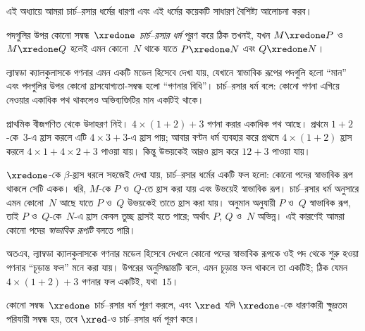 \documentclass[../../../include/open-logic-section]{subfiles}
\begin{document}


এই অধ্যায়ে আমরা চার্চ--রসার ধর্মের ধারণা এবং এই ধর্মের কয়েকটি সাধারণ
বৈশিষ্ট্য আলোচনা করব।

\begin{defn}[চার্চ--রসার ধর্ম, CR] পদগুলির উপর কোনো সম্বন্ধ~$\xredone$
  \emph{চার্চ--রসার ধর্ম} পূরণ করে ঠিক তখনই, যখন $M \xredone P$ ও
  $M \xredone Q$ হলেই এমন কোনো~$N$ থাকে যাতে $P \xredone N$ এবং
  $Q \xredone N$।
\end{defn}

ল্যাম্বডা ক্যালকুলাসকে গণনার এমন একটি মডেল হিসেবে দেখা যায়, যেখানে
স্বাভাবিক রূপের পদগুলি হলো “মান” এবং পদগুলির উপর কোনো হ্রাসযোগ্যতা-সম্বন্ধ
হলো “গণনার বিধি”। চার্চ--রসার ধর্ম বলে: কোনো গণনা এগিয়ে নেওয়ার একাধিক
পথ থাকলেও অভিব্যক্তিটির মান একটিই থাকে।

প্রাথমিক বীজগণিত থেকে উদাহরণ নিই। $4 \times (1+2) + 3$ গণনা করার
একাধিক পথ আছে। প্রথমে $1+2$-কে~$3$-এ হ্রাস করলে এটি $4 \times 3+3$-এ
হ্রাস পায়; আবার বণ্টন ধর্ম ব্যবহার করে প্রথমে $4 \times (1+2)$ হ্রাস
করলে $4 \times 1+4 \times 2+3$ পাওয়া যায়। কিন্তু উভয়কেই আরও হ্রাস
করে $12+3$ পাওয়া যায়।

$\xredone$-কে $\beta$-হ্রাস ধরলে সহজেই দেখা যায়, চার্চ--রসার ধর্মের
একটি ফল হলো: কোনো পদের স্বাভাবিক রূপ থাকলে সেটি একক। ধরি, $M$-কে
$P$ ও~$Q$-তে হ্রাস করা যায় এবং উভয়েই স্বাভাবিক রূপ। চার্চ--রসার ধর্ম
অনুসারে এমন কোনো~$N$ আছে যাতে $P$ ও~$Q$ উভয়কেই তাতে হ্রাস করা যায়।
অনুমান অনুযায়ী $P$ ও~$Q$ স্বাভাবিক রূপ, তাই $P$ ও~$Q$-কে~$N$-এ হ্রাস কেবল
তুচ্ছ হ্রাসই হতে পারে; অর্থাৎ $P$, $Q$ ও~$N$ অভিন্ন। এই কারণেই আমরা
কোনো পদের \emph{স্বাভাবিক রূপটি} বলতে পারি।

অতএব, ল্যাম্বডা ক্যালকুলাসকে গণনার মডেল হিসেবে দেখলে কোনো পদের স্বাভাবিক
রূপকে ওই পদ থেকে শুরু হওয়া গণনার “চূড়ান্ত ফল” মনে করা যায়। উপরের
অনুসিদ্ধান্তটি বলে, এমন চূড়ান্ত ফল থাকলে তা একটিই; ঠিক যেমন
$4 \times (1+2)+3$ গণনার ফল একটিই, যথা~$15$।

\begin{thm} 
  কোনো সম্বন্ধ~$\xredone$ চার্চ--রসার ধর্ম পূরণ করলে, এবং $\xred$ যদি
  $\xredone$-কে ধারণকারী ক্ষুদ্রতম পরিযায়ী সম্বন্ধ হয়, তবে $\xred$-ও
  চার্চ--রসার ধর্ম পূরণ করে।
\end{thm}
\end{document}

